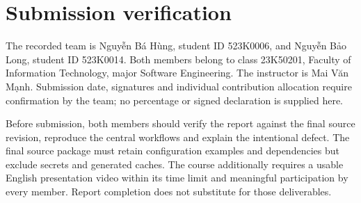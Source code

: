 \documentclass[12pt,a4paper,oneside]{report}
\begin{document}
\chapter{Submission verification}
The recorded team is Nguyễn Bá Hùng, student ID 523K0006, and Nguyễn Bảo Long, student ID 523K0014. Both members belong to class 23K50201, Faculty of Information Technology, major Software Engineering. The instructor is Mai Văn Mạnh. Submission date, signatures and individual contribution allocation require confirmation by the team; no percentage or signed declaration is supplied here.

Before submission, both members should verify the report against the final source revision, reproduce the central workflows and explain the intentional defect. The final source package must retain configuration examples and dependencies but exclude secrets and generated caches. The course additionally requires a usable English presentation video within its time limit and meaningful participation by every member. Report completion does not substitute for those deliverables.
\end{document}
